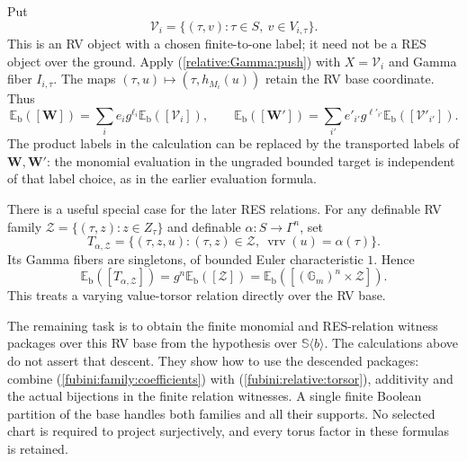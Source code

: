 \documentclass[12pt]{amsart}
\theoremstyle{remark}
\theoremstyle{definition}
\newcommand{\vrv}{\operatorname{vrv}}
\newcommand{\Sbase}{\mathbb S}
\numberwithin{equation}{section}
\newcommand{\Gm}{\mathbb G_m}
\theoremstyle{plain}
\begin{document}
{Put
\[
 \mathcal V_i=\{(\tau,v):\tau\in S,\ v\in V_{i,\tau}\}.
\]
This is an RV object with a chosen finite-to-one label;
it need not be a RES object over the ground.
Apply (\ref{relative:Gamma:push}) with
$X=\mathcal V_i$ and Gamma fiber $I_{i,\tau}$.
The maps $(\tau,u)\mapsto(\tau,h_{M_i}(u))$
retain the RV base coordinate. Thus
\begin{equation}\label{fubini:family:coefficients}
 \mathbb E_{\mathrm b}([\bm W])
   =\sum_i e_i g^{\ell_i}
               \mathbb E_{\mathrm b}([\mathcal V_i]),
 \qquad
 \mathbb E_{\mathrm b}([\bm W'])
   =\sum_{i'} e'_{i'}g^{\ell'_{i'}}
               \mathbb E_{\mathrm b}([\mathcal V'_{i'}]).
\end{equation}
The product labels in the calculation can be replaced by
the transported labels of $\bm W,\bm W'$: the monomial
evaluation in the ungraded bounded target is independent
of that label choice, as in the earlier evaluation formula.

There is a useful special case for the later RES relations.
For any definable RV family
$\mathcal Z=\{(\tau,z):z\in Z_\tau\}$ and definable
$\alpha:S\to\Gamma^n$, set
\[
 T_{\alpha,\mathcal Z}
  =\{(\tau,z,u):(\tau,z)\in\mathcal Z,\
                        \vrv(u)=\alpha(\tau)\}.
\]
Its Gamma fibers are singletons, of bounded Euler
characteristic $1$. Hence
\begin{equation}\label{fubini:relative:torsor}
 \mathbb E_{\mathrm b}([T_{\alpha,\mathcal Z}])
      =g^n\mathbb E_{\mathrm b}([\mathcal Z])
      =\mathbb E_{\mathrm b}([(\Gm)^n\times\mathcal Z]).
\end{equation}
This treats a varying value-torsor relation directly over
the RV base.

The remaining task is to obtain the finite monomial and
RES-relation witness packages over this RV base from the
hypothesis over $\Sbase\langle b\rangle$.
The calculations above do not assert that descent.
They show how to use the descended packages: combine
(\ref{fubini:family:coefficients}) with
(\ref{fubini:relative:torsor}), additivity and the actual
bijections in the finite relation witnesses.
A single finite Boolean partition of the base handles
both families and all their supports. No selected chart
is required to project surjectively, and every torus
factor in these formulas is retained.
}
\end{document}
